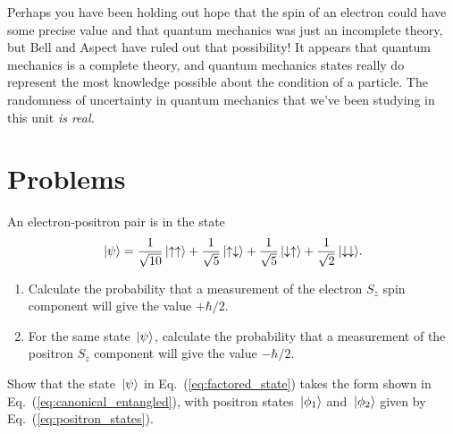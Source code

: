 Perhaps you have been holding out hope that the spin of an electron
could have some precise value and that quantum mechanics was just an
incomplete theory, but Bell and Aspect have ruled out that possibility!
It appears that quantum mechanics is a complete theory, and quantum
mechanics states really do represent the most knowledge possible about
the condition of a particle.  The randomness of uncertainty in quantum 
mechanics that we've been studying in this unit \emph{is real.}


\newpage

\section*{Problems}

\begin{problem}
  \label{prob:entangled_i}
  An electron-positron pair is in the state
  \[
  \,|\mbox{$\psi$}\rangle = \frac{1}{\sqrt{10}}\,|\mbox{$\uparrow\uparrow$}\rangle
  +\frac{1}{\sqrt{5}}\,|\mbox{$\uparrow\downarrow$}\rangle +
  \frac{1}{\sqrt{5}}\,|\mbox{$\downarrow\uparrow$}\rangle +
  \frac{1}{\sqrt{2}}\,|\mbox{$\downarrow\downarrow$}\rangle .
  \]
  \begin{enumerate}
  \item Calculate the probability that a measurement of the electron
    $S_z$ spin component will give the value $+\hbar/2$.
  \item For the same state $\,|\mbox{$\psi$}\rangle$, calculate the probability
    that a measurement of the positron $S_z$ component will give the
    value $-\hbar/2$.
  \end{enumerate}
\end{problem}



\begin{problem}
  Show that the state $\,|\mbox{$\psi$}\rangle$ in
  Eq.~(\ref{eq:factored_state}) takes the form shown in
  Eq.~(\ref{eq:canonical_entangled}), with positron states
  $\,|\mbox{$\phi_1$}\rangle$ and $\,|\mbox{$\phi_2$}\rangle$ given by
  Eq.~(\ref{eq:positron_states}).
\end{problem}

